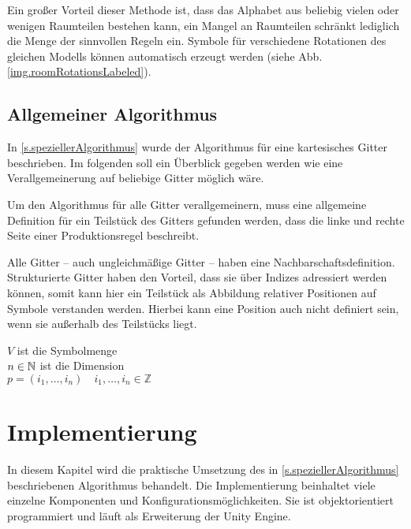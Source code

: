 
Ein großer Vorteil dieser Methode ist, dass das Alphabet aus beliebig vielen oder wenigen Raumteilen bestehen kann, ein Mangel an Raumteilen schränkt lediglich die Menge der sinnvollen Regeln ein. Symbole für verschiedene Rotationen des gleichen Modells können automatisch erzeugt werden (siehe Abb. \ref{img.roomRotationsLabeled}).


\section{Allgemeiner Algorithmus}\label{s.allgemeinerAlgorithmus}

In \ref{s.speziellerAlgorithmus} wurde der Algorithmus für eine kartesisches Gitter beschrieben. Im folgenden soll ein Überblick gegeben werden wie eine Verallgemeinerung auf beliebige Gitter möglich wäre.

Um den Algorithmus für alle Gitter verallgemeinern, muss eine allgemeine Definition für ein Teilstück des Gitters gefunden werden, dass die linke und rechte Seite einer Produktionsregel beschreibt. 

Alle Gitter -- auch ungleichmäßige Gitter -- haben eine Nachbarschaftsdefinition. Strukturierte Gitter haben den Vorteil, dass sie über Indizes adressiert werden können, somit kann hier ein Teilstück als Abbildung relativer Positionen auf Symbole verstanden werden. Hierbei kann eine Position auch nicht definiert sein, wenn sie außerhalb des Teilstücks liegt.

$ V $ ist die Symbolmenge \\
$ n \in \mathbb{N} $ ist die Dimension \\
$ p = (i_1, \dotsc , i_n) \quad i_1, \dotsc , i_n \in \mathbb{Z} $


\chapter{Implementierung}\label{c.implementierung}

In diesem Kapitel wird die praktische Umsetzung des in \ref{s.speziellerAlgorithmus} beschriebenen Algorithmus behandelt. Die Implementierung beinhaltet viele einzelne Komponenten und Konfigurationsmöglichkeiten. Sie ist objektorientiert programmiert und läuft als Erweiterung der Unity Engine. 

